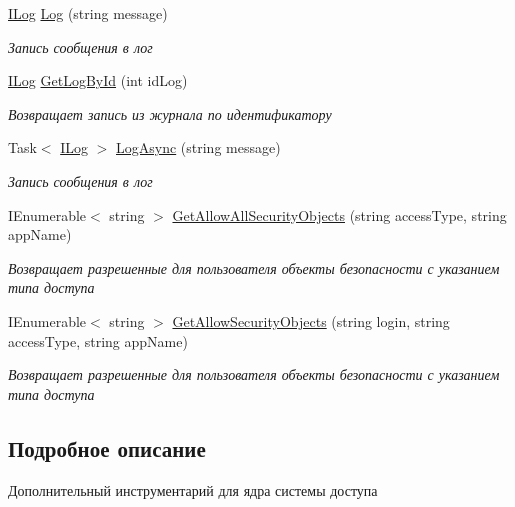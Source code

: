 \begin{DoxyCompactItemize}
\hyperlink{interface_security_1_1_interfaces_1_1_model_1_1_i_log}{I\+Log} \hyperlink{interface_security_1_1_interfaces_1_1_i_security_tools_aaf51a25b2c2a0e2242b6dca221638de5}{Log} (string message)
\begin{DoxyCompactList}\small\item\em Запись сообщения в лог \end{DoxyCompactList}\item 
\hyperlink{interface_security_1_1_interfaces_1_1_model_1_1_i_log}{I\+Log} \hyperlink{interface_security_1_1_interfaces_1_1_i_security_tools_ad76598f70498efa049a8cc6a60da9908}{Get\+Log\+By\+Id} (int id\+Log)
\begin{DoxyCompactList}\small\item\em Возвращает запись из журнала по идентификатору \end{DoxyCompactList}\item 
Task$<$ \hyperlink{interface_security_1_1_interfaces_1_1_model_1_1_i_log}{I\+Log} $>$ \hyperlink{interface_security_1_1_interfaces_1_1_i_security_tools_a43d1289cbb80b392be815479e48b9764}{Log\+Async} (string message)
\begin{DoxyCompactList}\small\item\em Запись сообщения в лог \end{DoxyCompactList}\item 
I\+Enumerable$<$ string $>$ \hyperlink{interface_security_1_1_interfaces_1_1_i_security_tools_a362e0c9e028821edf5bbb3a8b210e856}{Get\+Allow\+All\+Security\+Objects} (string access\+Type, string app\+Name)
\begin{DoxyCompactList}\small\item\em Возвращает разрешенные для пользователя объекты безопасности с указанием типа доступа \end{DoxyCompactList}\item 
I\+Enumerable$<$ string $>$ \hyperlink{interface_security_1_1_interfaces_1_1_i_security_tools_a6580f39f21207c7f2238a5b6a54fbddb}{Get\+Allow\+Security\+Objects} (string login, string access\+Type, string app\+Name)
\begin{DoxyCompactList}\small\item\em Возвращает разрешенные для пользователя объекты безопасности с указанием типа доступа \end{DoxyCompactList}\end{DoxyCompactItemize}


\subsection{Подробное описание}
Дополнительный инструментарий для ядра системы доступа 



